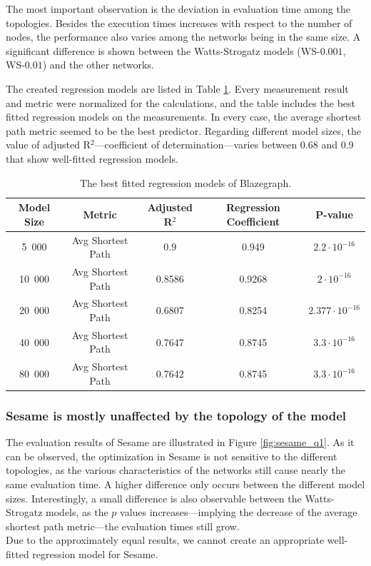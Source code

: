 The most important observation is the deviation in evaluation time among the topologies. Besides the execution times increases with respect to the number of nodes, the performance also varies among the networks being in the same size. A significant difference is shown between the Watts-Strogatz models (WS-$0.001$, WS-$0.01$) and the other networks.

The created regression models are listed in Table \ref{tab:regressions_blaze_a1}. Every measurement result and metric were normalized for the calculations, and the table includes the best fitted regression models on the measurements. In every case, the average shortest path metric seemed to be the best predictor. Regarding different model sizes, the value of adjusted R$^2$---\ie coefficient of determination---varies between 0.68 and 0.9 that show well-fitted regression models. 

\begin{table}[ht]
	\footnotesize
	\centering
	\begin{tabular}{ c c c c c}
		\toprule
		Model Size & Metric & Adjusted R$^2$& Regression Coefficient & P-value\\ \hline
		5~000 & Avg Shortest Path & $0.9$ & 0.949 & $2.2 \cdot 10^{-16}$ \\ 
		10~000 & Avg Shortest Path & 0.8586 & 0.9268 & $2 \cdot 10^{-16}$ \\ 
		20~000 & Avg Shortest Path & 0.6807 & 0.8254 & $2.377 \cdot 10^{-16}$\\ 
		40~000 & Avg Shortest Path & 0.7647 & 0.8745 & $3.3\cdot 10^{-16}$ \\  
		80~000 & Avg Shortest Path & 0.7642 & 0.8745 & $3.3\cdot 10^{-16}$ \\  
		\bottomrule
	\end{tabular}
	\caption{The best fitted regression models of Blazegraph.}
	\label{tab:regressions_blaze_a1}
\end{table}

\subsubsection{Sesame is mostly unaffected by the topology of the model}

The evaluation results of Sesame are illustrated in Figure \ref{fig:sesame_q1}. As it can be observed, the optimization in Sesame is not sensitive to the different topologies, as the various characteristics of the networks still cause nearly the same evaluation time. A higher difference only occurs between the different model sizes. Interestingly, a small difference is also observable between the Watts-Strogatz models, as the $p$ values increases---implying the decrease of the average shortest path metric---the evaluation times still grow.\\
Due to the approximately equal results, we cannot create an appropriate well-fitted regression model for Sesame.

